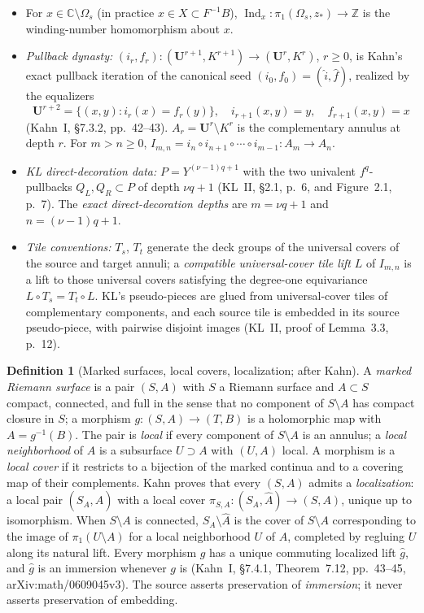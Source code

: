 \documentclass[11pt,reqno]{amsart}
\theoremstyle{definition}
\newtheorem{definition}[theorem]{Definition}
\theoremstyle{remark}
\begin{document}
\begin{itemize}
\item For \(x\in\mathbb C\setminus\Omega_s\) (in practice \(x\in X\subset F^{-1}B\)), \(\operatorname{Ind}_x\colon\pi_1(\Omega_s,z_*)\to\mathbb Z\) is the winding-number homomorphism about \(x\).
\item \emph{Pullback dynasty:} \((i_r,f_r)\colon(\mathbf U^{r+1},K^{r+1})\to(\mathbf U^r,K^r)\), \(r\ge0\), is Kahn's exact pullback iteration of the canonical seed \((i_0,f_0)=(\widehat i,\widehat f)\), realized by the equalizers
\[
 \mathbf U^{r+2}=\{(x,y):i_r(x)=f_r(y)\},
 \quad i_{r+1}(x,y)=y,\quad f_{r+1}(x,y)=x     \tag{2.1}
\]
(Kahn~I, \S7.3.2, pp.~42--43).  \(A_r=\mathbf U^r\setminus K^r\) is the complementary annulus at depth \(r\).  For \(m>n\ge0\),
\(I_{m,n}=i_n\circ i_{n+1}\circ\cdots\circ i_{m-1}\colon A_m\to A_n\).
\item \emph{KL direct-decoration data:} \(P=Y^{(\nu-1)q+1}\) with the two univalent \(f^q\)-pullbacks \(Q_L,Q_R\subset P\) of depth \(\nu q+1\) (KL~II, \S2.1, p.~6, and Figure~2.1, p.~7).  The \emph{exact direct-decoration depths} are \(m=\nu q+1\) and \(n=(\nu-1)q+1\).
\item \emph{Tile conventions:} \(T_s\), \(T_t\) generate the deck groups of the universal covers of the source and target annuli; a \emph{compatible universal-cover tile lift} \(L\) of \(I_{m,n}\) is a lift to those universal covers satisfying the degree-one equivariance \(L\circ T_s=T_t\circ L\).  KL's pseudo-pieces are glued from universal-cover tiles of complementary components, and each source tile is embedded in its source pseudo-piece, with pairwise disjoint images (KL~II, proof of Lemma~3.3, p.~12).
\end{itemize}
\begin{definition}[Marked surfaces, local covers, localization; after Kahn]\label{def:localization-seed}
A \emph{marked Riemann surface} is a pair \((S,A)\) with \(S\) a Riemann surface and \(A\subset S\) compact, connected, and full in the sense that no component of \(S\setminus A\) has compact closure in \(S\); a morphism \(g\colon(S,A)\to(T,B)\) is a holomorphic map with \(A=g^{-1}(B)\).  The pair is \emph{local} if every component of \(S\setminus A\) is an annulus; a \emph{local neighborhood} of \(A\) is a subsurface \(U\supset A\) with \((U,A)\) local.  A morphism is a \emph{local cover} if it restricts to a bijection of the marked continua and to a covering map of their complements.  Kahn proves that every \((S,A)\) admits a \emph{localization}: a local pair \((S_A,\widehat A)\) with a local cover \(\pi_{S,A}\colon(S_A,\widehat A)\to(S,A)\), unique up to isomorphism.  When \(S\setminus A\) is connected, \(S_A\setminus\widehat A\) is the cover of \(S\setminus A\) corresponding to the image of \(\pi_1(U\setminus A)\) for a local neighborhood \(U\) of \(A\), completed by regluing \(U\) along its natural lift.  Every morphism \(g\) has a unique commuting localized lift \(\widehat g\), and \(\widehat g\) is an immersion whenever \(g\) is (Kahn~I, \S7.4.1, Theorem~7.12, pp.~43--45, arXiv:math/0609045v3).  The source asserts preservation of \emph{immersion}; it never asserts preservation of embedding.
\end{definition}
\end{document}
